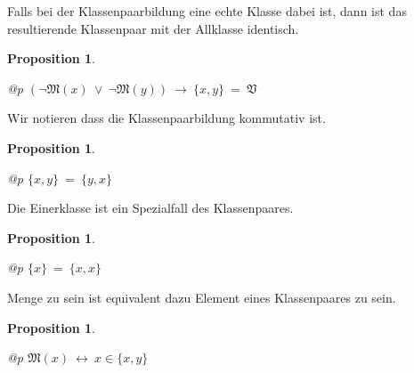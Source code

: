 \documentclass[a4paper,german,10pt,twoside]{book}
\newtheorem{prop}[thm]{Proposition}
\theoremstyle{definition}
\theoremstyle{remark}
\begin{document}
\par
Falls bei der Klassenpaarbildung eine echte Klasse dabei ist, dann ist das
resultierende Klassenpaar mit der Allklasse identisch.

\begin{prop}
\label{theorem:properClassPairIsUniversalClass} \hypertarget{theorem:properClassPairIsUniversalClass}{}
\mbox{}
\begin{longtable}{{@{\extracolsep{\fill}}p{\linewidth}}}
\centering $(\neg \mathfrak{M}(x)\ \lor \ \neg \mathfrak{M}(y))\ \rightarrow \ \{ x, y \} \ =  \ \mathfrak{V}$
\end{longtable}

\end{prop}




\par
Wir notieren dass die Klassenpaarbildung kommutativ ist.

\begin{prop}
\label{theorem:classPairBuildingIsCommutative} \hypertarget{theorem:classPairBuildingIsCommutative}{}
\mbox{}
\begin{longtable}{{@{\extracolsep{\fill}}p{\linewidth}}}
\centering $\{ x, y \} \ =  \ \{ y, x \}$
\end{longtable}

\end{prop}




\par
Die Einerklasse ist ein Spezialfall des Klassenpaares.

\begin{prop}
\label{theorem:singletonIsClassPair} \hypertarget{theorem:singletonIsClassPair}{}
\mbox{}
\begin{longtable}{{@{\extracolsep{\fill}}p{\linewidth}}}
\centering $\{ x \} \ =  \ \{ x, x \}$
\end{longtable}

\end{prop}




\par
Menge zu sein ist equivalent dazu Element eines Klassenpaares zu sein.

\begin{prop}
\label{theorem:setEquiInClassPair} \hypertarget{theorem:setEquiInClassPair}{}
\mbox{}
\begin{longtable}{{@{\extracolsep{\fill}}p{\linewidth}}}
\centering $\mathfrak{M}(x)\ \leftrightarrow \ x \in \{ x, y \}$
\end{longtable}

\end{prop}
\end{document}
